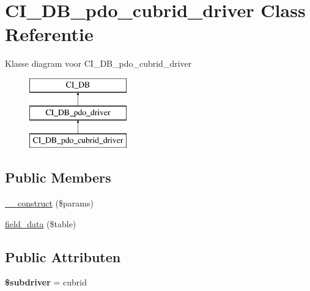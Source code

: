 \hypertarget{class_c_i___d_b__pdo__cubrid__driver}{}\section{C\+I\+\_\+\+D\+B\+\_\+pdo\+\_\+cubrid\+\_\+driver Class Referentie}
\label{class_c_i___d_b__pdo__cubrid__driver}
Klasse diagram voor C\+I\+\_\+\+D\+B\+\_\+pdo\+\_\+cubrid\+\_\+driver\begin{figure}[H]
\begin{center}
\leavevmode
\includegraphics[height=3.000000cm]{class_c_i___d_b__pdo__cubrid__driver}
\end{center}
\end{figure}
\subsection*{Public Members}
\begin{DoxyCompactItemize}
\item 
\mbox{\hyperlink{class_c_i___d_b__pdo__cubrid__driver_a9162320adff1a1a4afd7f2372f753a3e}{\+\_\+\+\_\+construct}} (\$params)
\item 
\mbox{\hyperlink{class_c_i___d_b__pdo__cubrid__driver_a90355121e1ed009e0efdbd544ab56efa}{field\+\_\+data}} (\$table)
\end{DoxyCompactItemize}
\subsection*{Public Attributen}
\begin{DoxyCompactItemize}
\item 
\mbox{\label{class_c_i___d_b__pdo__cubrid__driver_a1322ca756348b11d080cb7a4f590de15}} 
{\bfseries \$subdriver} = \textquotesingle{}cubrid\textquotesingle{}
\end{DoxyCompactItemize}
